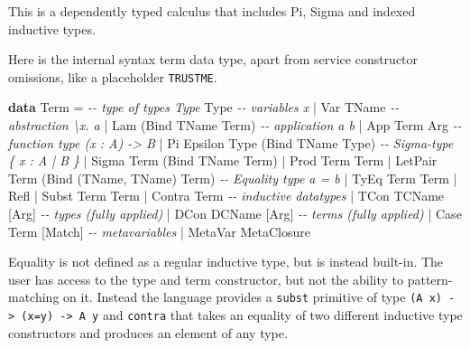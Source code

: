 \documentclass[
  sigconf,
  screen,
  review]{acmart}
\newenvironment{Shaded}{}{}
\newcommand{\CommentTok}[1]{\textcolor[rgb]{0.38,0.63,0.69}{\textit{#1}}}
\newcommand{\DataTypeTok}[1]{\textcolor[rgb]{0.56,0.13,0.00}{#1}}
\newcommand{\KeywordTok}[1]{\textcolor[rgb]{0.00,0.44,0.13}{\textbf{#1}}}
\newcommand{\NormalTok}[1]{#1}
\newcommand{\OperatorTok}[1]{\textcolor[rgb]{0.40,0.40,0.40}{#1}}
\newcommand{\OtherTok}[1]{\textcolor[rgb]{0.00,0.44,0.13}{#1}}
\begin{document}
This is a dependently typed calculus that includes Pi, Sigma and indexed
inductive types.

Here is the internal syntax term data type, apart from service
constructor omissions, like a placeholder \texttt{TRUSTME}.

\begin{Shaded}
\begin{Highlighting}[]
\KeywordTok{data} \DataTypeTok{Term} \OtherTok{=}
  \CommentTok{{-}{-} type of types Type}
    \DataTypeTok{Type}
  \CommentTok{{-}{-} variables x}
  \OperatorTok{|} \DataTypeTok{Var} \DataTypeTok{TName}
  \CommentTok{{-}{-} abstraction \textbackslash{}x. a}
  \OperatorTok{|} \DataTypeTok{Lam}\NormalTok{ (}\DataTypeTok{Bind} \DataTypeTok{TName} \DataTypeTok{Term}\NormalTok{)}
  \CommentTok{{-}{-} application a b}
  \OperatorTok{|} \DataTypeTok{App} \DataTypeTok{Term} \DataTypeTok{Arg}
  \CommentTok{{-}{-} function type (x : A) {-}\textgreater{} B}
  \OperatorTok{|} \DataTypeTok{Pi} \DataTypeTok{Epsilon} \DataTypeTok{Type}\NormalTok{ (}\DataTypeTok{Bind} \DataTypeTok{TName} \DataTypeTok{Type}\NormalTok{)}
  \CommentTok{{-}{-} Sigma{-}type \{ x : A | B \}}
  \OperatorTok{|} \DataTypeTok{Sigma} \DataTypeTok{Term}\NormalTok{ (}\DataTypeTok{Bind} \DataTypeTok{TName} \DataTypeTok{Term}\NormalTok{)}
  \OperatorTok{|} \DataTypeTok{Prod} \DataTypeTok{Term} \DataTypeTok{Term}
  \OperatorTok{|} \DataTypeTok{LetPair} \DataTypeTok{Term}\NormalTok{ (}\DataTypeTok{Bind}\NormalTok{ (}\DataTypeTok{TName}\NormalTok{, }\DataTypeTok{TName}\NormalTok{) }\DataTypeTok{Term}\NormalTok{)}
  \CommentTok{{-}{-} Equality type  a = b}
  \OperatorTok{|} \DataTypeTok{TyEq} \DataTypeTok{Term} \DataTypeTok{Term}
  \OperatorTok{|} \DataTypeTok{Refl}
  \OperatorTok{|} \DataTypeTok{Subst} \DataTypeTok{Term} \DataTypeTok{Term}
  \OperatorTok{|} \DataTypeTok{Contra} \DataTypeTok{Term}
  \CommentTok{{-}{-} inductive datatypes}
  \OperatorTok{|} \DataTypeTok{TCon} \DataTypeTok{TCName}\NormalTok{ [}\DataTypeTok{Arg}\NormalTok{] }\CommentTok{{-}{-} types (fully applied)}
  \OperatorTok{|} \DataTypeTok{DCon} \DataTypeTok{DCName}\NormalTok{ [}\DataTypeTok{Arg}\NormalTok{] }\CommentTok{{-}{-} terms (fully applied)}
  \OperatorTok{|} \DataTypeTok{Case} \DataTypeTok{Term}\NormalTok{ [}\DataTypeTok{Match}\NormalTok{]}
    \CommentTok{{-}{-} metavariables}
  \OperatorTok{|} \DataTypeTok{MetaVar} \DataTypeTok{MetaClosure}
\end{Highlighting}
\end{Shaded}

Equality is not defined as a regular inductive type, but is instead
built-in. The user has access to the type and term constructor, but not
the ability to pattern-matching on it. Instead the language provides a
\texttt{subst} primitive of type
\texttt{(A\ x)\ -\textgreater{}\ (x=y)\ -\textgreater{}\ A\ y} and
\texttt{contra} that takes an equality of two different inductive type
constructors and produces an element of any type.
\end{document}
